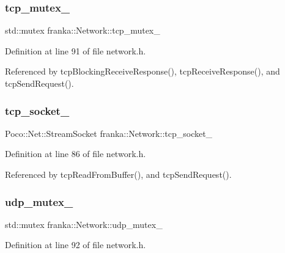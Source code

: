\subsubsection{\texorpdfstring{tcp\+\_\+mutex\+\_\+}{tcp\_mutex\_}}
{\footnotesize\ttfamily std\+::mutex franka\+::\+Network\+::tcp\+\_\+mutex\+\_\+\hspace{0.3cm}{\ttfamily [private]}}



Definition at line 91 of file network.\+h.



Referenced by tcp\+Blocking\+Receive\+Response(), tcp\+Receive\+Response(), and tcp\+Send\+Request().

\mbox{\label{classfranka_1_1Network_a2c26c04f9ccb9792074799b101ee53e9}} 
\subsubsection{\texorpdfstring{tcp\+\_\+socket\+\_\+}{tcp\_socket\_}}
{\footnotesize\ttfamily Poco\+::\+Net\+::\+Stream\+Socket franka\+::\+Network\+::tcp\+\_\+socket\+\_\+\hspace{0.3cm}{\ttfamily [private]}}



Definition at line 86 of file network.\+h.



Referenced by tcp\+Read\+From\+Buffer(), and tcp\+Send\+Request().

\mbox{\label{classfranka_1_1Network_ab22bfa46c27a565336d6231971b019be}} 
\subsubsection{\texorpdfstring{udp\+\_\+mutex\+\_\+}{udp\_mutex\_}}
{\footnotesize\ttfamily std\+::mutex franka\+::\+Network\+::udp\+\_\+mutex\+\_\+\hspace{0.3cm}{\ttfamily [private]}}



Definition at line 92 of file network.\+h.



